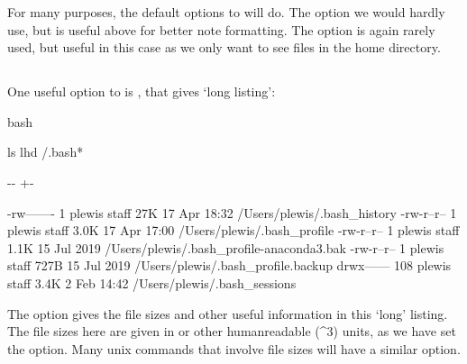 \documentclass[letterpaper,10pt,english]{sphinxmanual}
\newlength\nbsphinxcodecellspacing
\begin{document}
For many purposes, the default options to  will do. The  option we would hardly use, but is useful above for better note formatting. The  option is again rarely used, but useful in this case as we only want to see files in the home directory.


\subsection{}
\label{\detokenize{Appendix1:ls--l}}
One useful option to  is , that gives ‘long listing’:

{
\begin{sphinxVerbatim}[commandchars=\\\{\}]
\llap{\color{nbsphinxin}[9]:\,\hspace{\fboxrule}\hspace{\fboxsep}}\PYGZpc{}\PYGZpc{}bash

ls \PYGZhy{}lhd  \PYGZti{}/.bash*
\end{sphinxVerbatim}
}

{

\kern-\sphinxverbatimsmallskipamount\kern-\baselineskip
\kern+\FrameHeightAdjust\kern-\fboxrule
\vspace{\nbsphinxcodecellspacing}

\begin{sphinxVerbatim}[commandchars=\\\{\}]
-rw-------    1 plewis  staff    27K 17 Apr 18:32 /Users/plewis/.bash\_history
-rw-r--r--    1 plewis  staff   3.0K 17 Apr 17:00 /Users/plewis/.bash\_profile
-rw-r--r--    1 plewis  staff   1.1K 15 Jul  2019 /Users/plewis/.bash\_profile-anaconda3.bak
-rw-r--r--    1 plewis  staff   727B 15 Jul  2019 /Users/plewis/.bash\_profile.backup
drwx------  108 plewis  staff   3.4K  2 Feb 14:42 /Users/plewis/.bash\_sessions
\end{sphinxVerbatim}
}

The  option gives the file sizes and other useful information in this ‘long’ listing. The file sizes here are given in  or other human\sphinxhyphen{}readable (\textasciicircum{}3) units, as we have set the  option. Many unix commands that involve file sizes will have a similar  option.
\end{document}
